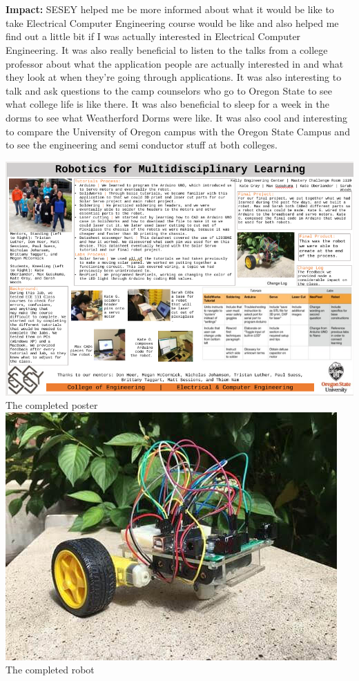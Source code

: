 {\\\\
\textbf{Impact: }SESEY helped me be more informed about what it would be like to take Electrical Computer Engineering course would be like and also helped me find out a little bit if I was actually interested in Electrical Computer Engineering. It was also really beneficial to listen to the talks from a college professor about what the application people are actually interested in and what they look at when they're going through applications. It was also interesting to talk and ask questions to the camp counselors who go to Oregon State to see what college life is like there. It was also beneficial to sleep for a week in the dorms to see what Weatherford Dorms were like. It was also cool and interesting to compare the University of Oregon campus with the Oregon State Campus and to see the engineering and semi conductor stuff at both colleges.

}
\begin{center}
    \includegraphics[width=.75\textwidth]{OutreachImages/SESEY(II).png}\\
    The completed poster
    \includegraphics[width=.75\textwidth]{OutreachImages/SESEY(I).jpeg}\\
    The completed robot
\end{center}

